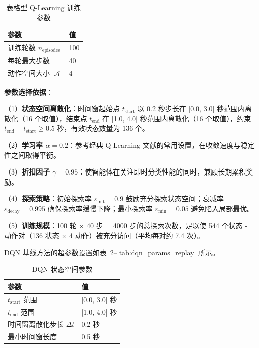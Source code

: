 \begin{table}[H]
\centering
\caption{表格型 Q-Learning 训练参数}
\label{tab:tabular_ql_params_train}
\begin{tabular}{ll}
\hline
\textbf{参数} & \textbf{值} \\
\hline
训练轮数 $n_{\text{episodes}}$ & 100 \\
每轮最大步数 & 40 \\
动作空间大小 $|\mathcal{A}|$ & 4 \\
\hline
\end{tabular}
\end{table}

\noindent\textbf{参数选择依据}：

（1）\textbf{状态空间离散化}：时间窗起始点 $t_{\text{start}}$ 以 0.2 秒步长在 [0.0, 3.0] 秒范围内离散化（16 个取值），结束点 $t_{\text{end}}$ 在 [1.0, 4.0] 秒范围内离散化（16 个取值），约束 $t_{\text{end}} - t_{\text{start}} \geq 0.5$ 秒，有效状态数量为 136 个。

（2）\textbf{学习率 $\alpha = 0.2$}：参考经典 Q-Learning 文献的常用设置，在收敛速度与稳定性之间取得平衡。

（3）\textbf{折扣因子 $\gamma = 0.95$}：使智能体在关注即时分类性能的同时，兼顾长期累积奖励。

（4）\textbf{探索策略}：初始探索率 $\varepsilon_{\text{init}} = 0.9$ 鼓励充分探索状态空间；衰减率 $\varepsilon_{\text{decay}} = 0.995$ 确保探索率缓慢下降；最小探索率 $\varepsilon_{\text{min}} = 0.05$ 避免陷入局部最优。

（5）\textbf{训练规模}：100 轮 × 40 步 = 4000 步的总探索次数，足以使 544 个状态 - 动作对（136 状态 × 4 动作）被充分访问（平均每对约 7.4 次）。

\label{subsec:dqn_params}

DQN 基线方法的超参数设置如表~\ref{tab:dqn_params_state}--\ref{tab:dqn_params_replay} 所示。

\begin{table}[H]
\centering
\caption{DQN 状态空间参数}
\label{tab:dqn_params_state}
\begin{tabular}{ll}
\hline
\textbf{参数} & \textbf{值} \\
\hline
$t_{\text{start}}$ 范围 & [0.0, 3.0] 秒 \\
$t_{\text{end}}$ 范围 & [1.0, 4.0] 秒 \\
时间窗离散化步长 $\Delta t$ & 0.2 秒 \\
最小时间窗长度 & 0.5 秒 \\
\hline
\end{tabular}
\end{table}

